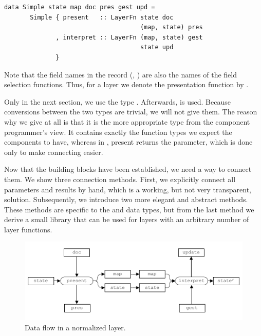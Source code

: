 \documentclass[preprint,natbib]{sigplanconf}
\begin{document}
\begin{small}
\begin{verbatim}
data Simple state map doc pres gest upd =
       Simple { present   :: LayerFn state doc 
                                     (map, state) pres
              , interpret :: LayerFn (map, state) gest
                                     state upd
              }
\end{verbatim}
\end{small}


Note that the field names in the record (, ) are also the names of the field selection functions. Thus, for a layer  we denote the presentation function by . 


\bc
Only in the next section, we use the type . Afterwards,  is used. Because conversions between the two types are trivial, we will not give them. The reason why we give  at all is that it is the more appropriate type from the component programmer's view. It contains exactly the function types we expect the components to have, whereas in , present returns the  parameter, which is done only to make connecting easier.
\ec

\bc
Now that the building blocks have been established, we need a way to connect them. We show three connection methods. First, we explicitly connect all parameters and results by hand, which is a working, but not very transparent, solution. Subsequently, we introduce two more elegant and abstract methods. These methods are specific to the  and  data types, but from the last method we derive a small library that can be used for layers with an arbitrary number of layer functions. 
\ec

\begin{figure}
\includegraphics[width=\columnwidth]{images/NormalizedLayer}
\caption{Data flow in a normalized layer.}\label{wrapped} 
\end{figure}
\end{document}

